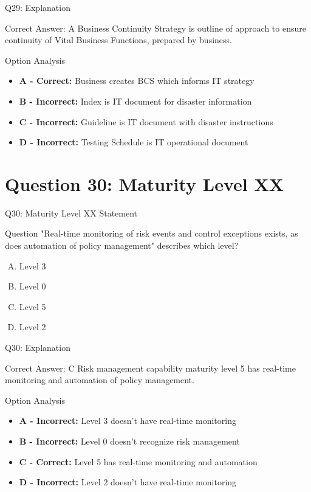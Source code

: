 \documentclass{beamer}
\begin{document}
	\begin{frame}{Q29: Explanation}
		\begin{block}{Correct Answer: A}
			Business Continuity Strategy is outline of approach to ensure continuity of Vital Business Functions, prepared by business.
		\end{block}
		\begin{block}{Option Analysis}
			\begin{itemize}
				\item \textbf{A - Correct:} Business creates BCS which informs IT strategy
				\item \textbf{B - Incorrect:} Index is IT document for disaster information
				\item \textbf{C - Incorrect:} Guideline is IT document with disaster instructions
				\item \textbf{D - Incorrect:} Testing Schedule is IT operational document
			\end{itemize}
		\end{block}
	\end{frame}
	
	\section{Question 30: Maturity Level XX}
	
	\begin{frame}{Q30: Maturity Level XX Statement}
		\begin{block}{Question}
			"Real-time monitoring of risk events and control exceptions exists, as does automation of policy management" describes which level?
		\end{block}
		\begin{enumerate}[(A)]
			\item Level 3
			\item Level 0
			\item Level 5
			\item Level 2
		\end{enumerate}
	\end{frame}
	
	\begin{frame}{Q30: Explanation}
		\begin{block}{Correct Answer: C}
			Risk management capability maturity level 5 has real-time monitoring and automation of policy management.
		\end{block}
		\begin{block}{Option Analysis}
			\begin{itemize}
				\item \textbf{A - Incorrect:} Level 3 doesn't have real-time monitoring
				\item \textbf{B - Incorrect:} Level 0 doesn't recognize risk management
				\item \textbf{C - Correct:} Level 5 has real-time monitoring and automation
				\item \textbf{D - Incorrect:} Level 2 doesn't have real-time monitoring
			\end{itemize}
		\end{block}
	\end{frame}
	
\end{document}
